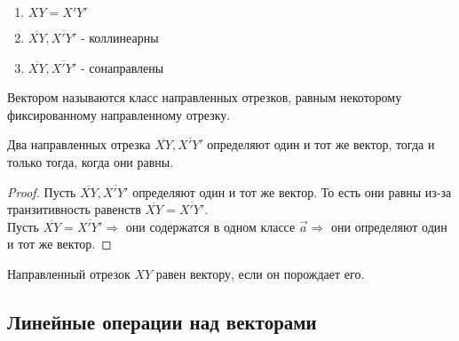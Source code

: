 	\begin{enumerate}
		\item \(XY = X'Y'\)
		\item \(\overline{XY}, \overline{X'Y'}\) - коллинеарны
		\item \(\overline{XY}, \overline{X'Y'}\) - сонаправлены
	\end{enumerate}
	
	\begin{definition}
		Вектором называются класс направленных отрезков, равным некоторому фиксированному направленному отрезку.
	\end{definition}
	\begin{proposition}
		Два направленных отрезка \(\overline{XY}, \overline{X'Y'}\) определяют один и тот же вектор, тогда и только тогда, когда они равны.
	\end{proposition}
	\begin{proof}
		Пусть \(\overline{XY}, \overline{X'Y'}\) определяют один и тот же вектор. То есть они равны из-за транзитивность равенств \(\overline{XY} = \overline{X'Y'}\). \\
		Пусть \(\overline{XY} = \overline{X'Y'} \Longrightarrow \) они содержатся в одном классе \(\vec{a} \Longrightarrow \) они определяют один и тот же вектор. 
	\end{proof}
	\begin{definition}
		Направленный отрезок $XY$ равен вектору, если он порождает его.
	\end{definition}
	\subsection{Линейные операции над векторами}

